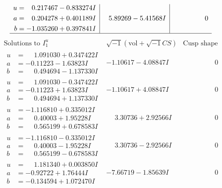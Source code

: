 \documentclass[1p]{elsarticle_modified}
\theoremstyle{definition}
\newcommand{\I}{\sqrt{-1}}
\begin{document}
$$\begin{array}{c|c|c}
\begin{aligned}
u &= \phantom{-}0.217467 - 0.833274 I \\
a &= \phantom{-}0.204278 + 0.401189 I \\
b &= -1.035260 + 0.397841 I\end{aligned}
 & \phantom{-}5.89269 - 5.41568 I & \phantom{-0.000000 } 0\\
 \hline 
 \end{array}$$\newpage$$\begin{array}{c|c|c}  
\text{Solutions to }I^u_{1}& \I (\text{vol} + \sqrt{-1}CS) & \text{Cusp shape}\\
 \hline 
\begin{aligned}
u &= \phantom{-}1.091030 + 0.347422 I \\
a &= -0.11223 - 1.63823 I \\
b &= \phantom{-}0.494694 - 1.137330 I\end{aligned}
 & -1.10617 - 4.08847 I & \phantom{-0.000000 } 0 \\ \hline\begin{aligned}
u &= \phantom{-}1.091030 - 0.347422 I \\
a &= -0.11223 + 1.63823 I \\
b &= \phantom{-}0.494694 + 1.137330 I\end{aligned}
 & -1.10617 + 4.08847 I & \phantom{-0.000000 } 0 \\ \hline\begin{aligned}
u &= -1.116810 + 0.335012 I \\
a &= \phantom{-}0.40003 + 1.95228 I \\
b &= \phantom{-}0.565199 + 0.678583 I\end{aligned}
 & \phantom{-}3.30736 + 2.92566 I & \phantom{-0.000000 } 0 \\ \hline\begin{aligned}
u &= -1.116810 - 0.335012 I \\
a &= \phantom{-}0.40003 - 1.95228 I \\
b &= \phantom{-}0.565199 - 0.678583 I\end{aligned}
 & \phantom{-}3.30736 - 2.92566 I & \phantom{-0.000000 } 0 \\ \hline\begin{aligned}
u &= \phantom{-}1.181340 + 0.003850 I \\
a &= -0.92722 + 1.76444 I \\
b &= -0.134594 + 1.072470 I\end{aligned}
 & -7.66719 - 1.85639 I & \phantom{-0.000000 } 0 \\ \hline\begin{aligned}

\end{aligned}
\end{array}$$
\end{document}
